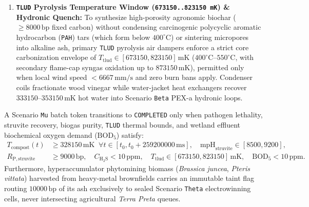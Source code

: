 \begin{enumerate}
    admission to CHP micro-turbines or Scenario \texttt{Theta} glassblowing torches. Exceeding $10\,\mathrm{ppm}$ $\mathrm{H_2S}$ switches
    motorized three-way valves to a standby regenerated iron-sponge column.
    \item \textbf{\texttt{TLUD} Pyrolysis Temperature Window (\texttt{673150..823150 mK}) \& Hydronic Quench:} To synthesize high-porosity
    agronomic biochar ($\ge 8000\,\mathrm{bp}$ fixed carbon) without condensing carcinogenic polycyclic aromatic hydrocarbon (\texttt{PAH}) tars
    (which form below $400^\circ\mathrm{C}$) or sintering micropores into alkaline ash, primary \texttt{TLUD} pyrolysis air dampers enforce a
    strict core carbonization envelope of $T_{\mathrm{tlud}} \in [673150, 823150]\,\mathrm{mK}$
    ($400^\circ\mathrm{C}\text{--}550^\circ\mathrm{C}$, with secondary flame-cap syngas oxidation up to $873150\,\mathrm{mK}$), permitted only
    when local wind speed $< 6667\,\mathrm{mm/s}$ and zero burn bans apply. Condenser coils fractionate wood vinegar while water-jacket heat
    exchangers recover $333150\text{--}353150\,\mathrm{mK}$ hot water into Scenario \texttt{Beta} PEX-a hydronic loops.
\end{enumerate}

\begin{invariant}
\label{inv:mu-biorefinery}
A Scenario \texttt{Mu} batch token transitions to \texttt{COMPLETED} only when pathogen lethality, struvite recovery, biogas purity,
\texttt{TLUD} thermal bounds, and wetland effluent biochemical oxygen demand ($\mathrm{BOD}_5$) satisfy:
\begin{align}
T_{\mathrm{compost}}(t) &\ge 328150\,\mathrm{mK}\;\;\forall t \in [t_0, t_0 + 259200000\,\mathrm{ms}], \quad \mathrm{mpH}_{\mathrm{struvite}} \in [8500, 9200], \\
R_{\mathrm{P,struvite}} &\ge 9000\,\mathrm{bp}, \quad C_{\mathrm{H_2S}} < 10\,\mathrm{ppm}, \quad T_{\mathrm{tlud}} \in [673150, 823150]\,\mathrm{mK}, \quad \mathrm{BOD}_5 < 10\,\mathrm{ppm}.
\end{align}
Furthermore, hyperaccumulator phytomining biomass (\emph{Brassica juncea}, \emph{Pteris vittata}) harvested from heavy-metal brownfields carries
an immutable taint flag routing $10000\,\mathrm{bp}$ of its ash exclusively to sealed Scenario \texttt{Theta} electrowinning cells, never
intersecting agricultural \emph{Terra Preta} queues.
\end{invariant}

